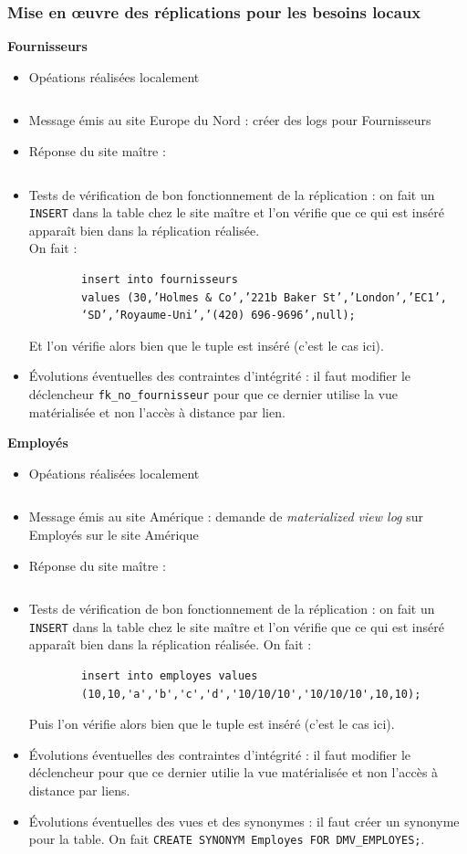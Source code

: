\documentclass[10pt,a4paper]{article}
\theoremstyle{plain}
\begin{document}
\subsubsection{Mise en \oe uvre des réplications pour les besoins locaux}
\textbf{Fournisseurs}
\begin{itemize}
    \item Opéations réalisées localement
    \inputminted{sql}{EUS_V-A-5-a1.sql}
    \item Message émis au site Europe du Nord : créer des logs pour Fournisseurs 
    \item Réponse du site maître :
    \inputminted{sql}{INSA-DB12-EuropeNord-rep-eu-n.sql}
    \item Tests de vérification de bon fonctionnement de la réplication : on fait un \verb|INSERT| dans la table chez le site maître et l'on vérifie que ce qui est inséré apparaît bien dans la réplication réalisée.\\
    On fait : 
    \begin{verbatim}
    	insert into fournisseurs
    	values (30,’Holmes & Co’,’221b Baker St’,’London’,’EC1’,
    	‘SD’,’Royaume-Uni’,’(420) 696-9696’,null);
    \end{verbatim}
   	Et l'on vérifie alors bien que le tuple est inséré (c'est le cas ici).
    
    \item Évolutions éventuelles des contraintes d'intégrité : il faut modifier le déclencheur \verb|fk_no_fournisseur| pour que ce dernier utilise la vue matérialisée et non l'accès à distance par lien.
\end{itemize}

\textbf{Employés}
\begin{itemize}
    \item Opéations réalisées localement
    \inputminted{sql}{EUS_V-A-5-b1.sql}
    \item Message émis au site Amérique : demande de \emph{materialized view log} sur Employés sur le site Amérique
    \item Réponse du site maître : \inputminted{sql}{EUS_V-A-5-b3.sql}
    \item Tests de vérification de bon fonctionnement de la réplication : on fait un \verb|INSERT| dans la table chez le site maître et l'on vérifie que ce qui est inséré apparaît bien dans la réplication réalisée.
    On fait :
    \begin{verbatim}
    	insert into employes values
    	(10,10,'a','b','c','d','10/10/10','10/10/10',10,10);
    \end{verbatim}
    Puis l'on vérifie alors bien que le tuple est inséré (c'est le cas ici).
    \item Évolutions éventuelles des contraintes d'intégrité : il faut modifier le déclencheur pour que ce dernier utilie la vue matérialisée et non l'accès à distance par liens.
    \item Évolutions éventuelles des vues et des synonymes : il faut créer un synonyme pour la table. On fait \verb|CREATE SYNONYM Employes FOR DMV_EMPLOYES;|.
\end{itemize}
\newpage 
\end{document}
